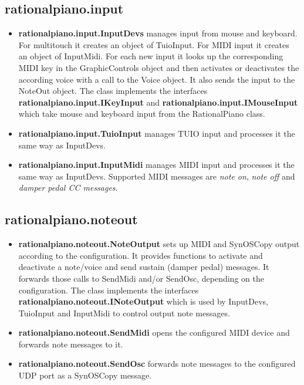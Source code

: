 \documentclass[12pt,a4paper,titlepage,oneside]{report}
\begin{document}
\subsection{rationalpiano.input}

\begin{itemize}
	\item \textbf{rationalpiano.input.InputDevs} manages input from mouse and keyboard. For multitouch it creates an object of TuioInput. For MIDI input it creates an object of InputMidi. For each new input it looks up the corresponding MIDI key in the GraphicControls object and then activates or deactivates the according voice with a call to the Voice object. It also sends the input to the NoteOut object. The class implements the interfaces \textbf{rationalpiano.input.IKeyInput} and \textbf{rationalpiano.input.IMouseInput} which take mouse and keyboard input from the RationalPiano class.

	\item \textbf{rationalpiano.input.TuioInput} manages TUIO input and processes it the same way as InputDevs.
	
	\item \textbf{rationalpiano.input.InputMidi} manages MIDI input and processes it the same way as InputDevs. Supported MIDI messages are \emph{note on}, \emph{note off} and \emph{damper pedal CC messages}.
\end{itemize}


\subsection{rationalpiano.noteout}

\begin{itemize}
	\item \textbf{rationalpiano.noteout.NoteOutput} sets up MIDI and SynOSCopy output according to the configuration. It provides functions to activate and deactivate a note/voice and send sustain (damper pedal) messages. It forwards those calls to SendMidi and/or SendOsc, depending on the configuration. The class implements the interfaces \textbf{rationalpiano.noteout.INoteOutput} which is used by InputDevs, TuioInput and InputMidi to control output note messages.

	\item \textbf{rationalpiano.noteout.SendMidi} opens the configured MIDI device and forwards note messages to it.

	\item \textbf{rationalpiano.noteout.SendOsc} forwards note messages to the configured UDP port as a SynOSCopy message.
\end{itemize}
\end{document}
